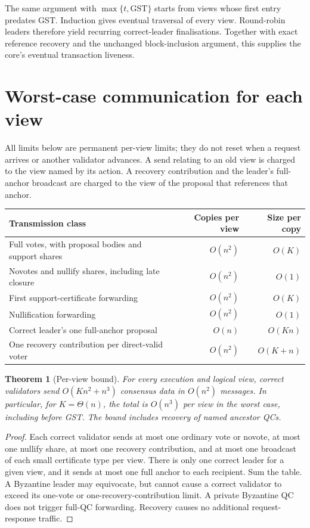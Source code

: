 \documentclass[11pt,a4paper]{article}
\newtheorem{theorem}{Theorem}
\theoremstyle{definition}
\newcommand{\GST}{\mathrm{GST}}
\begin{document}
The same argument with \(\max\{t,\GST\}\) starts from views whose first
entry predates GST. Induction gives eventual traversal of every view.
Round-robin leaders therefore yield recurring correct-leader finalisations.
Together with exact reference recovery and the unchanged block-inclusion
argument, this supplies the core's eventual transaction liveness.

\section{Worst-case communication for each view}
\label{sec:cost}

All limits below are permanent per-view limits; they do not reset when a
request arrives or another validator advances. A send relating to an old
view is charged to the view named by its action. A recovery contribution
and the leader's full-anchor broadcast are charged to the view of the
proposal that references that anchor.

\begin{center}
\small
\begin{tabularx}{\textwidth}{@{}Xrr@{}}
\toprule
Transmission class & Copies per view & Size per copy\\
\midrule
Full votes, with proposal bodies and support shares & \(O(n^2)\) & \(O(K)\)\\
Novotes and nullify shares, including late closure & \(O(n^2)\) & \(O(1)\)\\
First support-certificate forwarding & \(O(n^2)\) & \(O(K)\)\\
Nullification forwarding & \(O(n^2)\) & \(O(1)\)\\
Correct leader's one full-anchor proposal & \(O(n)\) & \(O(Kn)\)\\
One recovery contribution per direct-valid voter & \(O(n^2)\) & \(O(K+n)\)\\
\bottomrule
\end{tabularx}
\end{center}

\begin{theorem}[Per-view bound]\label{thm:cost}
For every execution and logical view, correct validators send
\(O(Kn^2+n^3)\) consensus data in \(O(n^2)\) messages. In particular, for
\(K=\Theta(n)\), the total is \(O(n^3)\) per view in the worst case,
including before GST. The bound includes recovery of named ancestor QCs.
\end{theorem}
\begin{proof}
Each correct validator sends at most one ordinary vote or novote, at most one
nullify share, at most one recovery contribution, and at most one broadcast
of each small certificate type per view. There is only one correct leader
for a given view, and it sends at most one full anchor to each recipient.
Sum the table. A Byzantine leader may equivocate, but cannot cause a correct
validator to exceed its one-vote or one-recovery-contribution limit. A
private Byzantine QC does not trigger full-QC forwarding. Recovery causes
no additional request-response traffic.
\end{proof}
\end{document}
